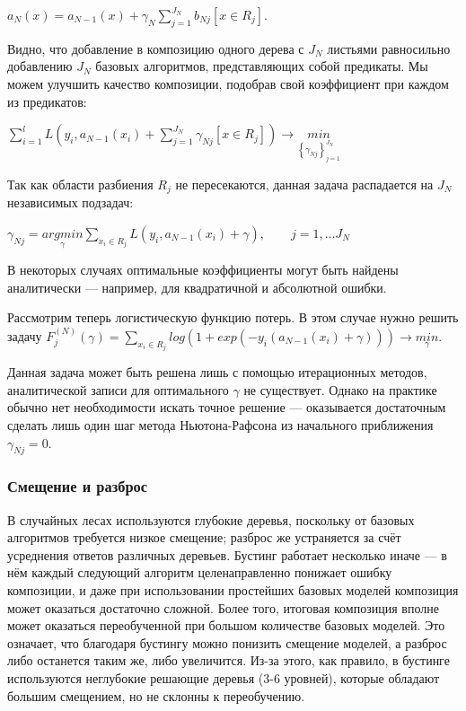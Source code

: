 \documentclass{article}
\theoremstyle{definition}
\theoremstyle{theorem}
\theoremstyle{remark}
\theoremstyle{theorem}
\theoremstyle{example}
\theoremstyle{theorem}
\theoremstyle{theorem}
\theoremstyle{theorem}
\theoremstyle{theorem}
\begin{document}
$a_N(x) = a_{N-1}(x) + \gamma_N \sum_{j=1}^{J_N}b_{Nj}[x\in R_j]$.

Видно, что добавление в композицию одного дерева с $J_N$ листьями равносильно добавлению $J_N$ базовых алгоритмов, представляющих собой предикаты. Мы можем улучшить качество композиции, подобрав свой коэффициент при каждом из предикатов: 

$\sum_{i=1}^{l} L\left(y_i,a_{N-1}(x_i) + \sum_{j=1}^{J_N} \gamma_{Nj}[x\in R_j]\right) \rightarrow \underset{\left\{\gamma_{Nj}\right\}^{J_N}_{j=1}}{min}$

Так как области разбиения $R_j$ не пересекаются, данная задача распадается на $J_N$ независимых подзадач:

$\gamma_{Nj} = \underset{\gamma}{argmin} \sum_{x_i \in R_j} L(y_i, a_{N-1}(x_i) + \gamma), \qquad j=1,\ldots J_N$

В некоторых случаях оптимальные коэффициенты могут быть найдены аналитически --- например, для квадратичной и абсолютной ошибки.

Рассмотрим теперь логистическую функцию потерь. В этом случае нужно решить задачу
$F_j^{(N)}(\gamma) = \sum_{x_i \in R_j} log(1 + exp(-y_i(a_{N-1}(x_i) + \gamma))) \rightarrow \underset{\gamma}{min}$.

Данная задача может быть решена лишь с помощью итерационных методов, аналитической записи для оптимального $\gamma$ не существует. Однако на практике обычно нет необходимости искать точное решение — оказывается достаточным сделать лишь один шаг метода Ньютона-Рафсона из начального приближения $\gamma_{Nj} = 0$. 

\subsubsection{Смещение и разброс}

В случайных лесах используются глубокие деревья, поскольку от базовых алгоритмов требуется низкое смещение; разброс же устраняется за счёт усреднения ответов различных деревьев. Бустинг работает несколько иначе — в
нём каждый следующий алгоритм целенаправленно понижает ошибку композиции, и даже при использовании простейших базовых моделей композиция может оказаться достаточно сложной. Более того, итоговая композиция вполне может оказаться переобученной при большом количестве базовых моделей. Это означает, что благодаря бустингу можно понизить смещение моделей, а разброс либо останется таким же, либо увеличится. Из-за этого, как правило, в бустинге используются неглубокие решающие деревья (3-6 уровней), которые обладают большим смещением, но не
склонны к переобучению.
\end{document}

